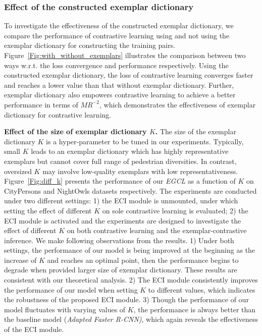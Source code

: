 \documentclass[journal]{IEEEtran}
\begin{document}
\subsubsection{Effect of the constructed exemplar dictionary}
To investigate the effectiveness of the constructed exemplar dictionary, we compare the performance of contrastive learning using and not using the exemplar dictionary for constructing the training pairs. Figure~\ref{Fig:with_without_exemplars} illustrates the comparison between two ways w.r.t. the loss convergence and performance respectively. Using the constructed exemplar dictionary, the loss of contrastive learning converges faster and reaches a lower value than that without exemplar dictionary. Further, exemplar dictionary also empowers contrastive learning to achieve a better performance in terms of $MR^{-2}$, which demonstrates the effectiveness of exemplar dictionary for contrastive learning.

\noindent\textbf{Effect of the size of exemplar dictionary $K$.} The size of the exemplar dictionary $K$ is a hyper-parameter to be tuned in our experiments. Typically, small $K$ leads to an exemplar dictionary which has highly representative exemplars but cannot cover full range of pedestrian diversities. In contrast, oversized $K$ may involve low-quality exemplars with low representativeness. Figure~\ref{Fig:diff_k} presents the performance of our \emph{EGCL} as a function of $K$ on CityPersons and NightOwls datasets respectively. The experiments are conducted under two different settings: 1) the ECI module is unmounted, under which setting the effect of different $K$ on sole contrastive learning is evaluated; 2) the ECI module is activated and the experiments are designed to investigate the effect of different $K$ on both contrastive learning and the exemplar-contrastive inference. We make following observations from the results. 1) Under both settings, the performance of our model is being improved at the beginning as the increase of $K$ and reaches an optimal point, then the performance begins to degrade when provided larger size of exemplar dictionary. These results are consistent with our theoretical analysis. 2) The ECI module consistently improves the performance of our model when setting $K$ to different values, which indicates the robustness of the proposed ECI module. 3) Though the performance of our model fluctuates with varying values of $K$, the performance is always better than the baseline model (\emph{Adapted Faster R-CNN)}, which again reveals the effectiveness of the ECI module.
\end{document}
